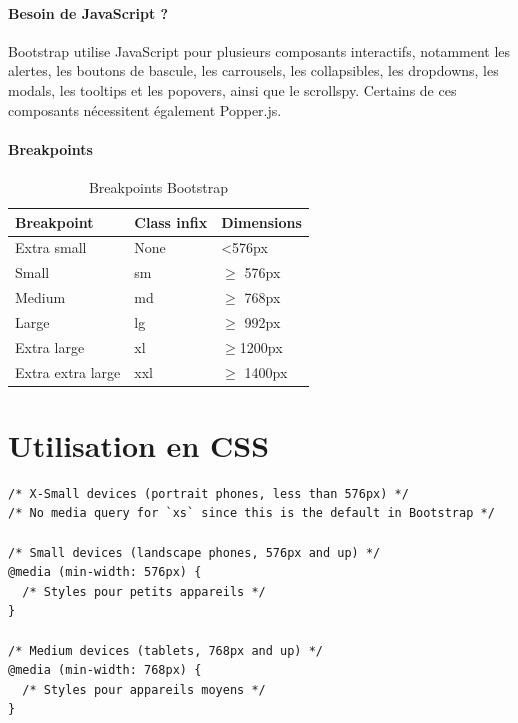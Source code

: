 \documentclass{report}
\begin{document}
\begin{multicols*}{2}
\paragraph{Besoin de JavaScript ?}
Bootstrap utilise JavaScript pour plusieurs composants interactifs, notamment les alertes, les boutons de bascule, les carrousels, les collapsibles, les dropdowns, les modals, les tooltips et les popovers, ainsi que le scrollspy. Certains de ces composants nécessitent également Popper.js.

\paragraph{Breakpoints}
\begin{table}[H]
    \centering
    \begin{tabular}{|l|l|l|}
        \hline
        \textbf{Breakpoint} & \textbf{Class infix} & \textbf{Dimensions} \\
        \hline
        Extra small & None & <576px \\
        Small & sm & $\geq$ 576px \\
        Medium & md & $\geq$ 768px \\
        Large & lg & $\geq$ 992px \\
        Extra large & xl & $\geq$1200px \\
        Extra extra large & xxl & $\geq$ 1400px \\
        \hline
    \end{tabular}
    \caption{Breakpoints Bootstrap}
\end{table}










\section*{Utilisation en CSS}

\begin{lstlisting}[style=CSSDraculaLight]
/* X-Small devices (portrait phones, less than 576px) */
/* No media query for `xs` since this is the default in Bootstrap */

/* Small devices (landscape phones, 576px and up) */
@media (min-width: 576px) {
  /* Styles pour petits appareils */
}

/* Medium devices (tablets, 768px and up) */
@media (min-width: 768px) {
  /* Styles pour appareils moyens */
}


\end{lstlisting}
\end{multicols*}
\end{document}
